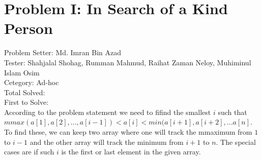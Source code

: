 \section*{Problem I: In Search of a Kind Person}
Problem Setter: Md. Imran Bin Azad \\
Tester: Shahjalal Shohag, Rumman Mahmud, Raihat Zaman Neloy, Muhiminul Islam Osim \\
Cetegory: Ad-hoc \\
Total Solved:  \\
First to Solve: \\

According to the problem statement we need to fifind the smallest $i$ such that
$mmax(a[1], a[2], ... , a[i-1]) < a[i] < min(a[i+1], a[i+2], ... a[n]$. To find
these, we can keep two array where one will track the mmaximum from $1$ to $i-1$
and the other array will track the minimum from $i+1$ to $n$. The special cases
are if such $i$ is the first or last element in the given array.